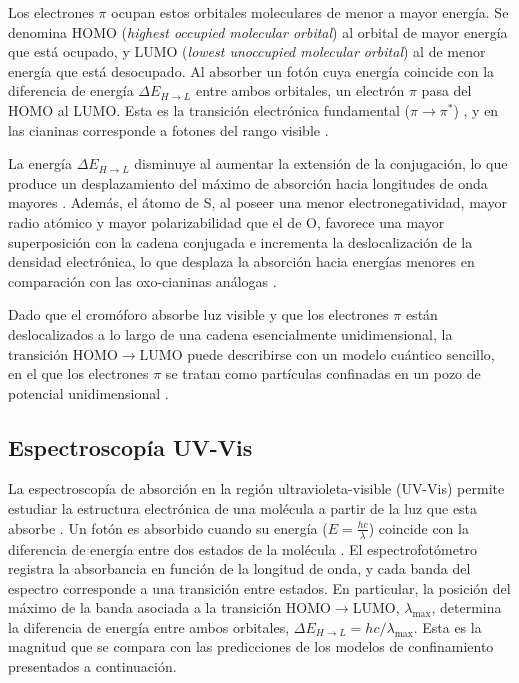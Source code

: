 \documentclass[12pt,a4paper,twocolumn]{informeUNLP} %
\begin{document}
Los electrones $\pi$ ocupan estos orbitales moleculares de menor a mayor energía. Se denomina HOMO (\textit{highest occupied molecular orbital}) al orbital de mayor energía que está ocupado, y LUMO (\textit{lowest unoccupied molecular orbital}) al de menor energía que está desocupado. Al absorber un fotón cuya energía coincide con la diferencia de energía $\Delta E_{H\rightarrow L}$ entre ambos orbitales, un electrón $\pi$ pasa del HOMO al LUMO. Esta es la transición electrónica fundamental ($\pi \rightarrow \pi^*$) \cite{pavia2014}, y en las cianinas corresponde a fotones del rango visible \cite{mishra2000}.

La energía $\Delta E_{H\rightarrow L}$ disminuye al aumentar la extensión de la conjugación, lo que produce un desplazamiento del máximo de absorción hacia longitudes de onda mayores \cite{pronkin2015}. Además, el átomo de S, al poseer una menor electronegatividad, mayor radio atómico y mayor polarizabilidad que el de O, favorece una mayor superposición con la cadena conjugada e incrementa la deslocalización de la densidad electrónica, lo que desplaza la absorción hacia energías menores en comparación con las oxo-cianinas análogas \cite{noukakis1995}.

Dado que el cromóforo absorbe luz visible y que los electrones $\pi$ están deslocalizados a lo largo de una cadena esencialmente unidimensional, la transición HOMO$\rightarrow$LUMO puede describirse con un modelo cuántico sencillo, en el que los electrones $\pi$ se tratan como partículas confinadas en un pozo de potencial unidimensional \cite{kuhn1949}.

\subsection{Espectroscopía UV-Vis}
La espectroscopía de absorción en la región ultravioleta-visible (UV-Vis) permite estudiar la estructura electrónica de una molécula a partir de la luz que esta absorbe \cite{skoog2017}. Un fotón es absorbido cuando su energía ($E = \frac{hc}{\lambda}$) coincide con la diferencia de energía entre dos estados de la molécula \cite{skoog2017}. El espectrofotómetro registra la absorbancia en función de la longitud de onda, y cada banda del espectro corresponde a una transición entre estados. En particular, la posición del máximo de la banda asociada a la transición HOMO$\rightarrow$LUMO, $\lambda_{\max}$, determina la diferencia de energía entre ambos orbitales, $\Delta E_{H\rightarrow L}=hc/\lambda_{\max}$. Esta es la magnitud que se compara con las predicciones de los modelos de confinamiento presentados a continuación.
\end{document}
